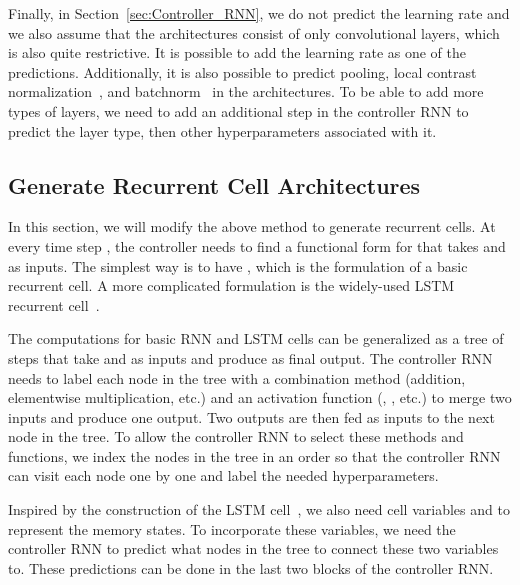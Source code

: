 \documentclass{article} \usepackage{iclr2017_conference,times}
\begin{document}
Finally, in Section~\ref{sec:Controller_RNN}, we do not predict the learning rate and we also assume that the architectures consist of only convolutional layers, which is also quite restrictive. It is possible to add the learning rate as one of the predictions. Additionally, it is also possible to predict pooling, local contrast normalization~\citep{jarrett2009best,krizhevsky2012imagenet}, and batchnorm~\citep{BatchNorm} in the architectures. To be able to add more types of layers, we need to add an additional step in the controller RNN to predict the layer type, then other hyperparameters associated with it. 


\subsection{Generate Recurrent Cell Architectures}
\label{sec:recurrent_cell}
In this section, we will modify the above method to generate recurrent cells. At every time step , the controller needs to find a functional form for  that takes  and  as inputs. The simplest way is to have , which is the formulation of a basic recurrent cell. A more complicated formulation is the widely-used LSTM recurrent cell~\citep{lstm}.


The computations for basic RNN and LSTM cells can be generalized as a tree of steps that take  and  as inputs and produce  as final output. The controller RNN needs to label each node in the tree with a combination method (addition, elementwise multiplication, etc.) and an activation function (, , etc.) to merge two inputs and produce one output. Two outputs are then fed as inputs to the next node in the tree. To allow the controller RNN to select these methods and functions, we index the nodes in the tree in an order so that the controller RNN can visit each node one by one and label the needed hyperparameters.


Inspired by the construction of the LSTM cell~\citep{lstm}, we also need cell variables  and  to represent the memory states. To incorporate these variables, we need the controller RNN to predict what nodes in the tree to connect these two variables to. These predictions can be done in the last two blocks of the controller RNN. 
\end{document}
